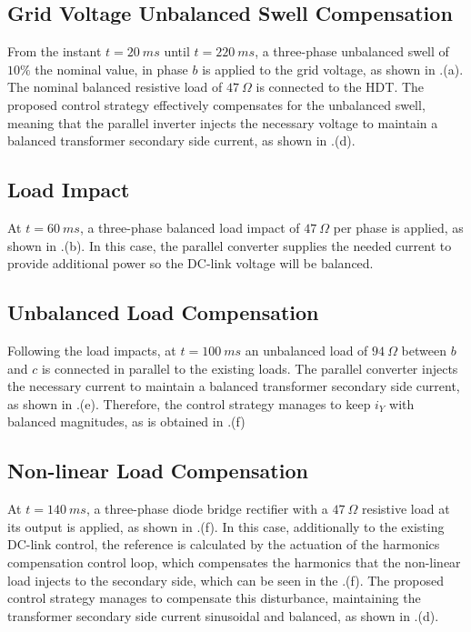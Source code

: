 \subsection{Grid Voltage Unbalanced Swell Compensation}

From the instant $t = 20\ ms$ until $t = 220\ ms$, a three-phase unbalanced swell of $10\%$ the nominal value, in phase $b$ is applied to the grid voltage, as shown in .(a). The nominal balanced resistive load of $47\ \Omega$ is connected to the HDT. The proposed control strategy effectively compensates for the unbalanced swell, meaning that the parallel inverter injects the necessary voltage to maintain a balanced transformer secondary side current, as shown in .(d).

\subsection{Load Impact}

At $t = 60\ ms$, a three-phase balanced load impact of $47\ \Omega$ per phase is applied, as shown in .(b). In this case, the parallel converter supplies the needed current to provide additional power so the DC-link voltage will be balanced.

\subsection{Unbalanced Load Compensation}

Following the load impacts, at $t = 100\ ms$ an unbalanced load of $94\ \Omega$ between $b$ and $c$ is connected in parallel to the existing loads. The parallel converter injects the necessary current to maintain a balanced transformer secondary side current, as shown in .(e). Therefore, the control strategy manages to keep $i_Y$ with balanced magnitudes, as is obtained in .(f)

\subsection{Non-linear Load Compensation}

At $t = 140\ ms$, a three-phase diode bridge rectifier with a $47\ \Omega$ resistive load at its output is applied, as shown in .(f). In this case, additionally to the existing DC-link control, the reference is calculated by the actuation of the harmonics compensation control loop, which compensates the harmonics that the non-linear load injects to the secondary side, which can be seen in the .(f). The proposed control strategy manages to compensate this disturbance, maintaining the transformer secondary side current sinusoidal and balanced, as shown in .(d).

